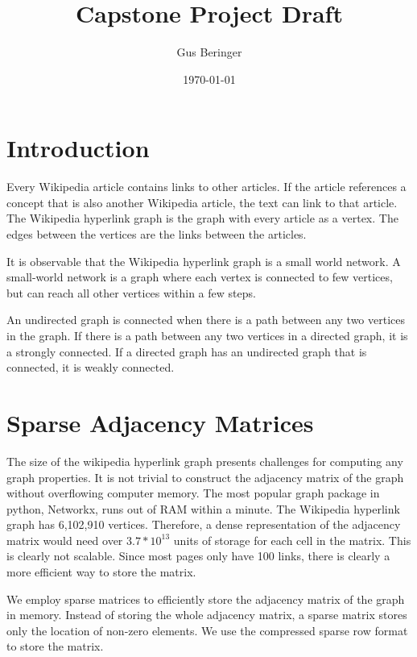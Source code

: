 \documentclass{article}
\author{Gus Beringer}
\title{Capstone Project Draft}
\date{\today}
\begin{document}
\maketitle
\tableofcontents

\section{Introduction}

Every Wikipedia article contains links to other articles. If the article references a concept that is also another Wikipedia article, the text can link to that article.
The Wikipedia hyperlink graph is the graph with every article as a vertex. The edges between the vertices are the links between the articles.

It is observable that the Wikipedia hyperlink graph is a small world network.
A small-world network is a graph where each vertex is connected to few vertices, but can reach all other vertices within a few steps.

An undirected graph is connected when there is a path between any two vertices in the graph.
If there is a path between any two vertices in a directed graph, it is a strongly connected.
If a directed graph has an undirected graph that is connected, it is weakly connected.


\section{Sparse Adjacency Matrices}

The size of the wikipedia hyperlink graph presents challenges for computing any graph properties.
It is not trivial to construct the adjacency matrix of the graph without overflowing computer memory.
The most popular graph package in python, Networkx, runs out of RAM within a minute.
The Wikipedia hyperlink graph has 6,102,910 vertices.
Therefore, a dense representation of the adjacency matrix would need over $3.7 * 10^{13}$ units of storage for each cell in the matrix.
This is clearly not scalable.
Since most pages only have 100 links, there is clearly a more efficient way to store the matrix.

We employ sparse matrices to efficiently store the adjacency matrix of the graph in memory.
Instead of storing the whole adjacency matrix, a sparse matrix stores only the location of non-zero elements.
We use the compressed sparse row format to store the matrix.
\end{document}
